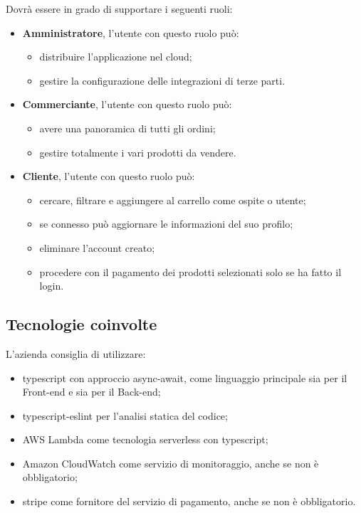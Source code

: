 Dovrà essere in grado di supportare i seguenti ruoli:
\begin{itemize}
	\item \textbf{Amministratore}, l'utente con questo ruolo può:
		\begin{itemize}
			\item distribuire l'applicazione nel cloud;
			\item gestire la configurazione delle integrazioni di terze parti.
		\end{itemize}
	\item \textbf{Commerciante}, l'utente con questo ruolo può:
		\begin{itemize}
			\item avere una panoramica di tutti gli ordini;
			\item gestire totalmente i vari prodotti da vendere.
		\end{itemize}
	\item \textbf{Cliente}, l'utente con questo ruolo può:
	\begin{itemize}
		\item cercare, filtrare e aggiungere al carrello come ospite o utente;
		\item se connesso può aggiornare le informazioni del suo profilo;
		\item eliminare l'account creato;
		\item procedere con il pagamento dei prodotti selezionati solo se ha fatto il login.
	\end{itemize}
\end{itemize}

\subsection{Tecnologie coinvolte}
L'azienda consiglia di utilizzare:
\begin{itemize}
	\item typescript con approccio async-await, come linguaggio principale sia per il Front-end e sia per il Back-end;
	\item typescript-eslint per l'analisi statica del codice;
	\item AWS Lambda come tecnologia serverless con typescript;
	\item Amazon CloudWatch come servizio di monitoraggio, anche se non è obbligatorio;
	\item stripe come fornitore del servizio di pagamento, anche se non è obbligatorio.
\end{itemize}

